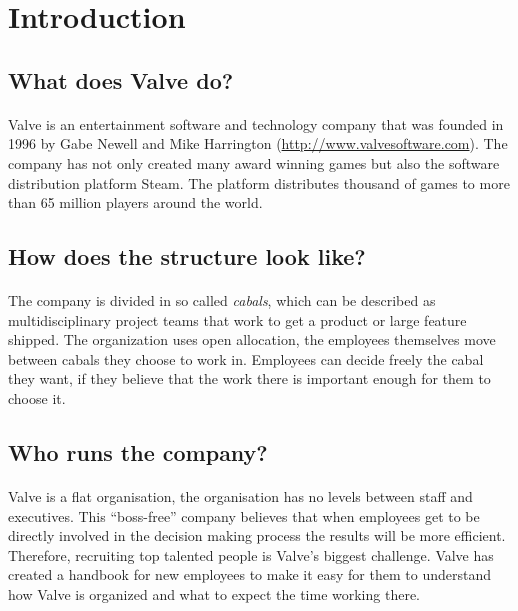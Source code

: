 \documentclass[12pt,twoside,notitle,a4paper]{article}
\begin{document}
\newpage
\section{Introduction}
\subsection{What does Valve do?}
\paragraph{}Valve is an entertainment software and technology company that was founded in 1996 by Gabe Newell and Mike Harrington (\url{http://www.valvesoftware.com}). The company has not only created many award winning games but also the software distribution platform Steam. The platform distributes thousand of games to more than 65 million players around the world.

\subsection{How does the structure look like?}
\paragraph{}The company is divided in so called \textit{cabals}, which can be described as multidisciplinary project teams that work to get a product or large feature shipped. The organization uses open allocation, the employees themselves move between cabals they choose to work in. Employees can decide freely the cabal they want, if they believe that the work there is important enough for them to choose it. 

\subsection{Who runs the company?}
\paragraph{}Valve is a flat organisation, the organisation has no levels between staff and executives. This “boss-free” company believes that when employees get to be directly involved in the decision making process the results will be more efficient. Therefore, recruiting top talented people is Valve’s biggest challenge. Valve has created a handbook for new employees to make it easy for them to understand how Valve is organized and what to expect the time working there. 
\end{document}
